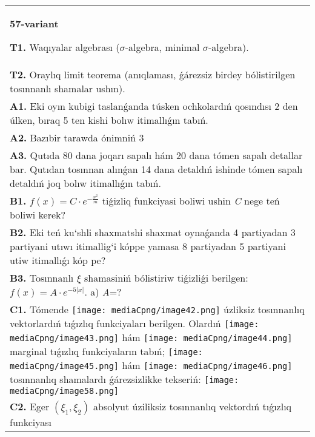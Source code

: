 \documentclass{article}
\begin{document}
\begin{tabular}{m{17cm}}
\textbf{57-variant}
\newline

\textbf{T1.} Waqıyalar algebrası ($\sigma$-algebra, minimal $\sigma$-algebra).
 \\
\textbf{T2.} Oraylıq limit teorema (anıqlaması, ǵárezsiz birdey bólistirilgen tosınnanlı shamalar ushın).
 \\
\textbf{A1.} Eki oyın kubigi taslanǵanda túsken ochkolardıń qosındısı 2 den úlken, bıraq 5 ten kishi bolıw itimallıǵın tabıń.
 \\
\textbf{A2.} Bazıbir tarawda ónimniń 3%
 \\
\textbf{A3.} Qutıda 80 dana joqarı sapalı hám 20 dana tómen sapalı detallar bar. Qutıdan tosınnan alınǵan 14 dana detaldıń ishinde tómen sapalı detaldıń joq bolıw itimallıǵın tabıń.
 \\
\textbf{B1.} \(f(x) = C \cdot e^{- \frac{x^{2}}{m}}\) tiǵizliq funkciyasi boliwi ushin \emph{C} nege teń boliwi kerek?
 \\
\textbf{B2.} Eki teń ku`shli shaxmatshi shaxmat oynaǵanda 4 partiyadan 3 partiyani utıwı itimallig`i kóppe yamasa 8 partiyadan 5 partiyani utiw itimallıǵı kóp pe?
 \\
\textbf{B3.} Tosınnanlı $\xi$ shamasiniń bólistiriw tiǵizliǵi berilgen: \(f(x) = A \cdot e^{- 5|x|}\). a) \emph{A}=?
 \\
\textbf{C1.} Tómende \texttt{[image: mediaCpng/image42.png]} úzliksiz tosınnanlıq vektorlardıń tıǵızlıq funkciyaları berilgen. Olardıń \texttt{[image: mediaCpng/image43.png]} hám \texttt{[image: mediaCpng/image44.png]} marginal tıǵızlıq funkciyaların tabıń; \texttt{[image: mediaCpng/image45.png]} hám \texttt{[image: mediaCpng/image46.png]} tosınnanlıq shamalardı ǵárezsizlikke tekseriń: \texttt{[image: mediaCpng/image58.png]}
 \\
\textbf{C2.} Eger \(\left( \xi_{1},\xi_{2} \right)\) absolyut úziliksiz tosınnanlıq vektordıń tıǵızlıq funkciyası \(f(x,y) = \left\{ \begin{matrix}

\end{matrix}
\end{tabular}
\end{document}
